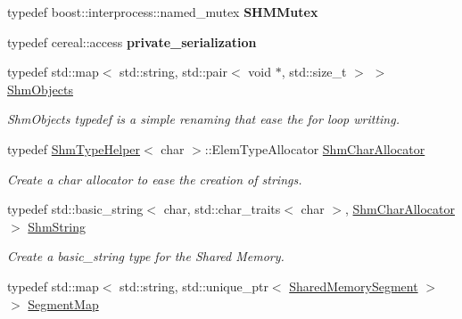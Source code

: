 \begin{DoxyCompactItemize}
\item 
typedef boost\+::interprocess\+::named\+\_\+mutex {\bfseries S\+H\+M\+Mutex}\hypertarget{namespaceshared__memory_a9e455ab41b63e529ceca7424dbf13ba1}{}\label{namespaceshared__memory_a9e455ab41b63e529ceca7424dbf13ba1}

\item 
typedef cereal\+::access {\bfseries private\+\_\+serialization}\hypertarget{namespaceshared__memory_ada3eeebd8f77a3757ad50c9401bcd249}{}\label{namespaceshared__memory_ada3eeebd8f77a3757ad50c9401bcd249}

\item 
typedef std\+::map$<$ std\+::string, std\+::pair$<$ void $\ast$, std\+::size\+\_\+t $>$ $>$ \hyperlink{namespaceshared__memory_ae50b2192256821112a69e47d5314b467}{Shm\+Objects}\hypertarget{namespaceshared__memory_ae50b2192256821112a69e47d5314b467}{}\label{namespaceshared__memory_ae50b2192256821112a69e47d5314b467}

\begin{DoxyCompactList}\small\item\em Shm\+Objects typedef is a simple renaming that ease the for loop writting. \end{DoxyCompactList}\item 
typedef \hyperlink{structshared__memory_1_1ShmTypeHelper}{Shm\+Type\+Helper}$<$ char $>$\+::Elem\+Type\+Allocator \hyperlink{namespaceshared__memory_a36a105df63154c883e86f4282f380647}{Shm\+Char\+Allocator}\hypertarget{namespaceshared__memory_a36a105df63154c883e86f4282f380647}{}\label{namespaceshared__memory_a36a105df63154c883e86f4282f380647}

\begin{DoxyCompactList}\small\item\em Create a char allocator to ease the creation of strings. \end{DoxyCompactList}\item 
typedef std\+::basic\+\_\+string$<$ char, std\+::char\+\_\+traits$<$ char $>$, \hyperlink{namespaceshared__memory_a36a105df63154c883e86f4282f380647}{Shm\+Char\+Allocator} $>$ \hyperlink{namespaceshared__memory_a07ee51d077030d33ba8408f5938569cc}{Shm\+String}\hypertarget{namespaceshared__memory_a07ee51d077030d33ba8408f5938569cc}{}\label{namespaceshared__memory_a07ee51d077030d33ba8408f5938569cc}

\begin{DoxyCompactList}\small\item\em Create a basic\+\_\+string type for the Shared Memory. \end{DoxyCompactList}\item 
typedef std\+::map$<$ std\+::string, std\+::unique\+\_\+ptr$<$ \hyperlink{classshared__memory_1_1SharedMemorySegment}{Shared\+Memory\+Segment} $>$ $>$ \hyperlink{namespaceshared__memory_a9aeebdfb6185497cac7c093cf3d765c5}{Segment\+Map}\hypertarget{namespaceshared__memory_a9aeebdfb6185497cac7c093cf3d765c5}{}\label{namespaceshared__memory_a9aeebdfb6185497cac7c093cf3d765c5}


\end{DoxyCompactItemize}
